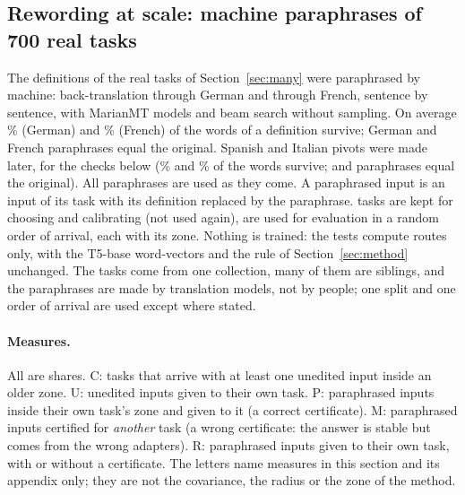 \subsection{Rewording at scale: machine paraphrases of 700 real tasks}
\label{sec:paraphrase}

The definitions of the \WidenTasksAll{} real tasks of Section~\ref{sec:many} were paraphrased by machine: back-translation through German and through French, sentence by sentence, with MarianMT models \citep{junczys2018marian,tiedemann2020opusmt} and beam search without sampling. On average \WidenKeptDe{}\% (German) and \WidenKeptFr{}\% (French) of the words of a definition survive; \WidenSameDe{} German and \WidenSameFr{} French paraphrases equal the original. Spanish and Italian pivots were made later, for the checks below (\WidenSpKept{}\% and \RerouteItKept{}\% of the words survive; \WidenSpSame{} and \RerouteItSame{} paraphrases equal the original). All paraphrases are used as they come. A paraphrased input is an input of its task with its definition replaced by the paraphrase. \WidenTasksCal{} tasks are kept for choosing and calibrating (not used again), \WidenTasksEval{} are used for evaluation in a random order of arrival, each with its zone. Nothing is trained: the tests compute routes only, with the T5-base word-vectors and the rule of Section~\ref{sec:method} unchanged. The tasks come from one collection, many of them are siblings, and the paraphrases are made by translation models, not by people; one split and one order of arrival are used except where stated.

\paragraph{Measures.} All are shares. \textsf{C}: tasks that arrive with at least one unedited input inside an older zone. \textsf{U}: unedited inputs given to their own task. \textsf{P}: paraphrased inputs inside their own task's zone and given to it (a correct certificate). \textsf{M}: paraphrased inputs certified for \emph{another} task (a wrong certificate: the answer is stable but comes from the wrong adapters). \textsf{R}: paraphrased inputs given to their own task, with or without a certificate. The letters name measures in this section and its appendix only; they are not the covariance, the radius or the zone of the method.

